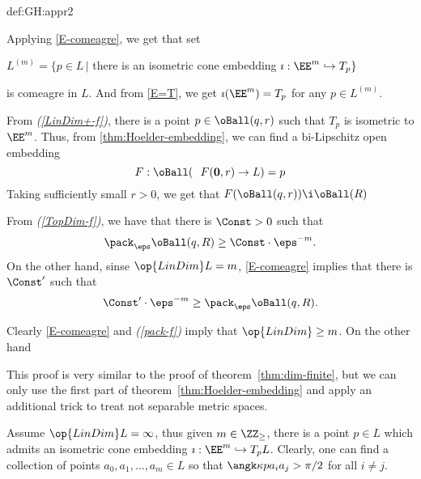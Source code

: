 {\begin{subthm}{def:GH:appr2}
\medskip

\parit{(\ref{LinDim-f})${}+{}$(\ref{pack-f}) $\Rightarrow$ (\ref{LinDim+-f})}
Applying \ref{E-comeagre}, we get that set 
\begin{center}
$L^{(m)}=\{p\in L\,|$ there is an isometric cone embedding $\imath:\EE^m\hookrightarrow T_p\}$
\end{center} 
is comeagre in $L$.
And from \ref{E=T}, we get $\imath(\EE^m)= T_p$ for any $p\in L^{(m)}$.

From \textit{(\ref{LinDim+-f})}, there is a point $p\in \oBall(q,r)$ such that $T_p$ is isometric to $\EE^m$.
Thus, from \ref{thm:Hoelder-embedding}, we can find a bi-Lipschitz open embedding 
$$F:\oBall(\ \ F(\mathbf 0,r)\to L)=p$$
Taking sufficiently small $r>0$, we get that $F(\oBall(q,r))\i \oBall(R)$

From \textit{(\ref{TopDim-f})}, we have that there is  $\Const>0$ such that
$$\pack_\eps\oBall(q,R)\ge \Const\cdot\eps^{-m}.$$
On the other hand, sinse $\op{LinDim}L= m$, \ref{E-comeagre} implies that there is  $\Const'$ such that
$$\Const'\cdot\eps^{-m}\ge \pack_\eps\oBall(q,R).$$

Clearly \ref{E-comeagre} and \textit{(\ref{pack-f})} imply  that $\op{LinDim}\ge m$.
On the other hand 
\qeds



 This proof is very similar to the proof of theorem~\ref{thm:dim-finite}, but we can only use the first part of theorem~\ref{thm:Hoelder-embedding} and apply an additional trick to treat not separable metric spaces.


Assume $\op{LinDim}L=\infty$, thus given $m\in\ZZ_\ge$, there is  a point $p\in L$ which admits an isometric cone embedding 
$\imath:\EE^m\hookrightarrow T_pL$.
Clearly, one can find a collection of points $a_0,a_1,\dots, a_m\in L$ so that $\angk\kappa p{a_i}{a_j}>\pi/2$ for all $i\not=j$.
\qeds














\end{subthm}}
